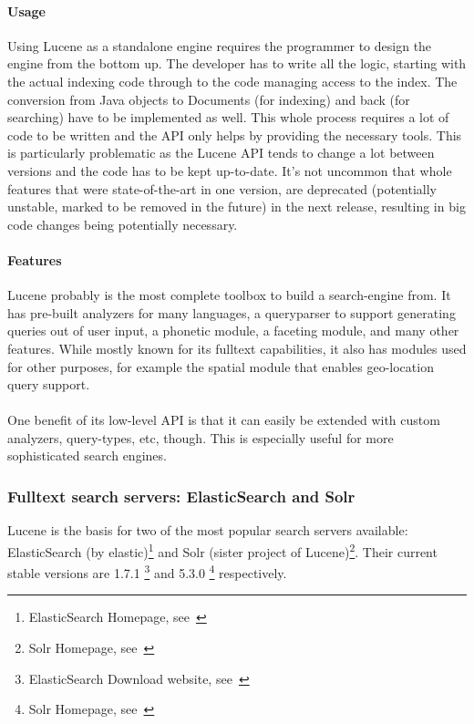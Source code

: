 \pagebreak

\paragraph{Usage}
Using Lucene as a standalone engine requires the programmer to design the engine from the bottom up. The developer has to write all the logic, starting with the actual indexing code through to the code managing access to the index. The conversion from Java objects to Documents (for indexing) and back (for searching) have to be implemented as well. This whole process requires a lot of code to be written and the API only helps by providing the necessary tools. This is particularly problematic as the Lucene API tends to change a lot between versions and the code has to be kept up-to-date. It's not uncommon that whole features that were state-of-the-art in one version, are deprecated (potentially unstable, marked to be removed in the future) in the next release, resulting in big code changes being potentially necessary.

\paragraph{Features}
Lucene probably is the most complete toolbox to build a search-engine from. It has pre-built analyzers for many languages, a queryparser to support generating queries out of user input, a phonetic module, a faceting module, and many other features. While mostly known for its fulltext capabilities, it also has modules used for other purposes, for example the spatial module that enables geo-location query support.
\\\\
One benefit of its low-level API is that it can easily be extended with custom analyzers, query-types, etc, though. This is especially useful for more sophisticated search engines.

\pagebreak

\subsubsection{Fulltext search servers: ElasticSearch and Solr}
Lucene is the basis for two of the most popular search servers available: ElasticSearch (by elastic)\footnote{ElasticSearch Homepage, see~\cite{elasticsearch_homepage}} and Solr (sister project of Lucene)\footnote{Solr Homepage, see~\cite{solr_homepage}}. Their current stable versions are 1.7.1 \footnote{ElasticSearch Download website, see~\cite{elasticsearch_downloads_website}} and 5.3.0 \footnote{Solr Homepage, see~\cite{solr_homepage}} respectively.

